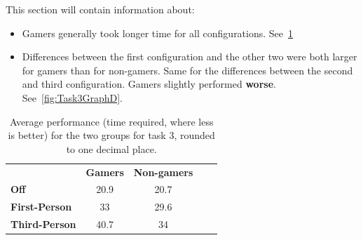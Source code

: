 \documentclass[runningheads,a4paper,oribibl]{llncs}
\begin{document}
This section will contain information about:
\begin{itemize}
	\item Gamers generally took longer time for all configurations. See~\ref{tab:Task3GraphP}
	\item Differences between the first configuration and the other two were both larger for gamers than for non-gamers. Same for the differences between the second and third configuration. Gamers slightly performed \textbf{worse}. See~\ref{fig:Task3GraphD}.
\end{itemize}



\begin{table}[]
\centering
\label{tab:Task3GraphP}
\setlength{\tabcolsep}{1em}
\def\arraystretch{1.8}
\begin{tabular}{l|c|cll}
                      & {\textbf{Gamers}} & {\textbf{Non-gamers}} &  &  \\ \cline{1-3}
\textbf{Off}          & 20.9                                    & 20.7                                          &  &  \\ \cline{1-3}
\textbf{First-Person} & 33                                   & 29.6                                        &  &  \\ \cline{1-3}
\textbf{Third-Person} & 40.7                                    & 34                                        &  & 
\end{tabular}
\caption{Average performance (time required, where less is better) for the two groups for task 3, rounded to one decimal place.}
\end{table}


\end{document}
